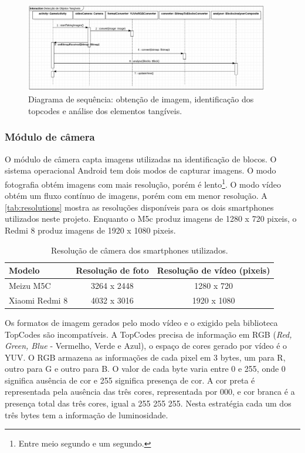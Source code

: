 \begin{figure}
    \centering
    \includegraphics[width=0.95\textwidth,fbox]{figs/sequence_diagram.png}
    \caption{Diagrama de sequência: obtenção de imagem, identificação dos topcodes e análise dos elementos tangíveis.}
    \label{fig:sequence_diagram}
\end{figure}

\subsubsection{Módulo de câmera}
\label{sec:camera}

O módulo de câmera capta imagens utilizadas na identificação de blocos. O sistema operacional Android tem dois modos de capturar imagens. O modo fotografia obtém imagens com mais resolução, porém é lento\footnote{Entre meio segundo e um segundo.}. O modo vídeo obtém um fluxo contínuo de imagens, porém com em menor resolução. A \autoref{tab:resolutions} mostra as resoluções disponíveis para os dois smartphones utilizados neste projeto. Enquanto o M5c produz imagens de 1280 x 720 pixeis, o Redmi 8 produz imagens de 1920 x 1080 pixeis.

{\renewcommand{\arraystretch}{1.5}
    
    \begin{table}[!h]
        \begin{tabular}{|l|c|c|} \hline
        Modelo         	   & Resolução de foto & Resolução de vídeo (pixeis) \\ \hline
        Meizu M5C          & 3264 x 2448       & 1280 x 720  \\ \hline
        Xiaomi Redmi 8     & 4032 x 3016       & 1920 x 1080 \\ \hline
        \end{tabular}
        \caption{Resolução de câmera dos smartphones utilizados.}
        \label{tab:resolutions}
    \end{table}   
}

Os formatos de imagem gerados pelo modo vídeo e o exigido pela biblioteca TopCodes são incompatíveis. A TopCodes precisa de informação em RGB (\textit{Red, Green, Blue} - Vermelho, Verde e Azul), o espaço de cores gerado por vídeo é o YUV. O RGB armazena as informações de cada pixel em 3 bytes, um para R, outro para G e outro para B. O valor de cada byte varia entre 0 e 255, onde 0 significa ausência de cor e 255 significa presença de cor. A cor preta é representada pela ausência das três cores, representada por 000, e cor branca é a presença total das três cores, igual a 255 255 255. Nesta estratégia cada um dos três bytes tem a informação de luminosidade.

